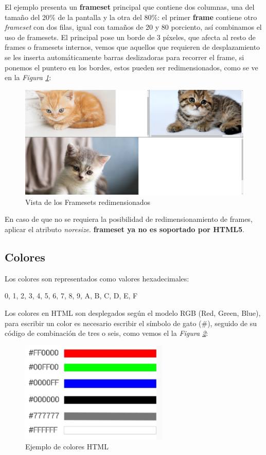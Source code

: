 El ejemplo presenta un \textbf{frameset} principal que contiene dos columnas, una del tamaño del 20\% de la pantalla y la otra del 80\%: el primer \textbf{frame} contiene otro \textit{frameset} con dos filas, igual con tamaños de 20 y 80 porciento, así combinamos el uso de framesets. El principal pose un borde de 3 píxeles, que afecta al resto de frames o framesets internos, vemos que aquellos que requieren de desplazamiento se les inserta automáticamente barras deslizadoras para recorrer el frame, si ponemos el puntero en los bordes, estos pueden ser redimensionados, como se ve en la \textit{Figura \ref{fig: 10}}:
\begin{figure}[H]
    \begin{center}
        \caption{Vista de los Framesets redimensionados}
        \label{fig: 10}
        \includegraphics[width=13cm]{ss_html/frames_2.png}
    \end{center}
\end{figure}

En caso de que no se requiera la posibilidad de redimensionamiento de frames, aplicar el atributo \textit{noresize}. \textbf{frameset ya no es soportado por HTML5}.


\subsection{Colores}
\hspace{0.55cm}Los colores son representados como valores hexadecimales:
\begin{center}
    0, 1, 2, 3, 4, 5, 6, 7, 8, 9, A, B, C, D, E, F
\end{center}

Los colores en HTML son desplegados según el modelo RGB (Red, Green, Blue), para escribir un color es necesario escribir el símbolo de gato (\#), seguido de su código de combinación de tres o seis, como vemos el la \textit{Figura \ref{fig: 11}}:
\begin{figure}[H]
    \centering
    \caption{Ejemplo de colores HTML}
    \label{fig: 11}
    \includegraphics[width=7cm]{ss_html/ejemplo_colores.png}
\end{figure}
